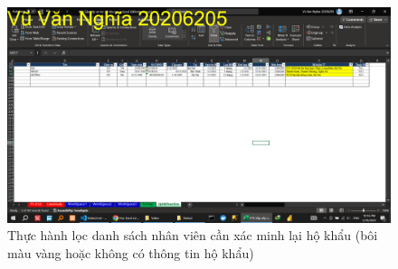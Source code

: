 \documentclass{article}
\begin{document}
\begin{figure}[h]
    \centering
    \includegraphics[scale = 0.15]{Video2/ThucHanh/6.png}
    \caption{Thực hành lọc danh sách nhân viên cần xác minh lại hộ khẩu (bôi màu vàng hoặc không có thông tin hộ khẩu)}
\end{figure}
\end{document}
